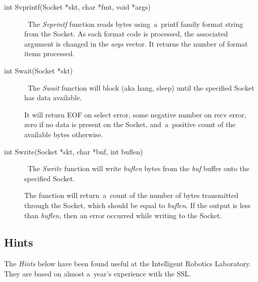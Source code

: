 \documentclass[12pt]{article}
\def\SSL{{\small SSL}}
\begin{document}
\begin{description}
\item[int Svprintf(Socket *skt, char *fmt, void *args)] \     The {\em Svprintf} function reads bytes using~a~printf family format string
    from the Socket.  As each format code is processed, the associated argument
    is changed in the {\em args} vector.  It returns the number of format items
    processed.

\item[int Swait(Socket *skt)] \     The {\em Swait} function will block (aka hang, sleep) until the specified
    Socket has data available.

    It will return EOF on select error, some negative number on recv error,
    zero if no data is present on the Socket, and~a~positive count of the
    available bytes otherwise.

\item[int Swrite(Socket *skt, char *buf, int buflen)] \     The {\em Swrite} function will write {\em buflen} bytes from the {\em buf}
    buffer onto the specified Socket.

    The function will return~a~count of the number of bytes transmitted through
    the Socket, which should be equal to {\em buflen}.  If the output is less
    than {\em buflen}, then an error occurred while writing to the Socket.

\end{description}


\subsection{Hints}

The {\em Hints} below have been found useful at the Intelligent Robotics
Laboratory.  They are based on almost a~year's experience with the \SSL.
\end{document}
